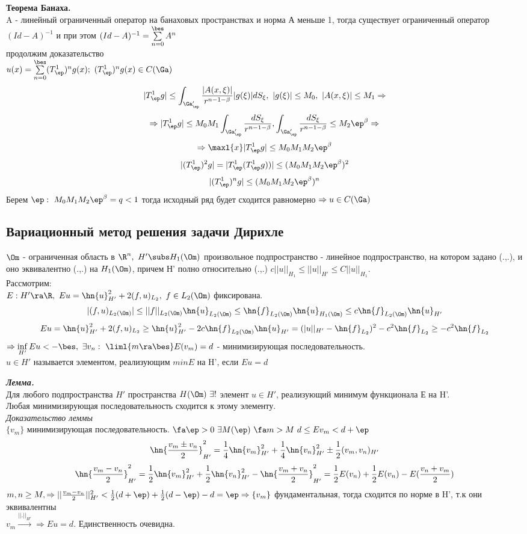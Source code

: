 \documentclass[a4paper,draft]{article}
\begin{document}
\textbf{Теорема Банаха.}\\
A - линейный ограниченный оператор на банаховых пространствах
и норма А меньше 1, тогда существует ограниченный оператор
$(Id-A)^{-1}$  и при этом $(Id-A)^{-1}=\sum\limits_{n=0}^\bes A^n$\\
продолжим доказательство\\
$u(x)=\sum\limits_{n=0}^\bes (T_\ep^1)^n g(x);\ (T_\ep^1)^n g(x)\in C(\Ga)$
$$
|T_\ep^1 g|\le
\int_{\Ga'_\ep}\frac{|A(x,\xi)|}{r^{n-1-\beta}}|g(\xi)|dS_\xi,\
|g(\xi)|\le M_0,\ |A(x,\xi)|\le M_1\Rightarrow
$$
$$
\Rightarrow
|T_\ep^1 g|\le
M_0M_1\int_{\Ga'_\ep}\frac{dS_\xi}{r^{n-1-\beta}},
\int_{\Ga'_\ep}\frac{dS_\xi}{r^{n-1-\beta}}\le M_2\ep^\beta
\Rightarrow
$$
$$
\Rightarrow
\maxl{x}|T_\ep^1 g|\le
M_0 M_1 M_2 \ep^\beta
$$
$$
|(T_\ep^1)^2 g|=|T_\ep^1(T_\ep^1 g))|\le (M_0M_1M_2\ep^\beta)^2
$$
$$
|(T_\ep^1)^n g|\le (M_0M_1M_2\ep^\beta)^n
$$
Берем $\ep:\ M_0M_1M_2\ep^\beta=q<1$ тогда исходный ряд будет сходится равномерно
$\Rightarrow u\in C(\Ga)$

\subsection{Вариационный метод решения задачи Дирихле}
$\Om$ - ограниченная область в $\R^n,\ H'\subs H_1(\Om)$
произвольное подпространство - линейное подпространство,
на котором задано (.,.), и оно эквивалентно (.,.) на $H_1(\Om)$,
причем Н' полно относительно (.,.) $c||u||_{H_1}\le||u||_{H'}\le C||u||_{H_1}$.\\
Рассмотрим:\\
$E:H'\ra\R,\ Eu=\hn{u}_{H'}^2+2(f,u)_{L_2},\ f\in L_2(\Om)$ фиксирована.
$$
|(f,u)_{L_2(\Om)}|\le||f||_{L_2(\Om)} \hn{u}_{L_2(\Om)}\le \hn{f}_{L_2(\Om)} \hn{u}_{H_1(\Om)}\le
c \hn{f}_{L_2(\Om)} \hn{u}_{H'}
$$
$$
Eu=\hn{u}_{H'}^2+2(f,u)_{L_2}\ge \hn{u}_{H'}^2-2c \hn{f}_{L_2(\Om)}\hn{u}_{H'}
=(|u||_{H'}-\hn{f}_{L_2})^2-c^2\hn{f}_{L_2}\ge -c^2\hn{f}_{L_2}
$$
$\Rightarrow \inf\limits_{H'}Eu<-\bes,\ \exists v_n:\ \liml{m\ra\bes}E(v_m)=d$
- минимизирующая последовательность.\\
$u\in H'$ называется элементом, реализующим $min E$ на H', если $Eu=d$

\textbf{\textit{Лемма.}}\\
Для любого подпространства $H'$ пространства $H(\Om)\ \exists !$
элемент $u\in H'$, реализующий минимум функционала Е на H'.\\
Любая минимизирующая последовательность сходится к этому элементу.\\
\textit{Доказательство леммы}\\
$\{v_m\}$ минимизирующая последовательность. $\fa\ep>0\
\exists M(\ep)\ \fa m>M\ d\le Ev_m<d+\ep$
$$
\hn{\frac{v_m\pm v_n}{2}}_{H'}^2= \frac14 \hn{v_m}_{H'}^2+\frac14 \hn{v_n}_{H'}^2 \pm\frac12(v_m,v_n)_{H'}
$$
$$\hn{\frac{v_m- v_n}{2}}_{H'}^2= \frac12 \hn{v_m}_{H'}^2+\frac12 \hn{v_n}_{H'}^2- \hn{\frac{v_m+ v_n}{2}}_{H'}^2
=\frac12E(v_n)+\frac12E(v_n)-E(\frac{v_n+v_m}{2})
$$
$
m,n\ge M,\Rightarrow
||\frac{v_m- v_n}{2}||_{H'}^2<\frac12(d+\ep)+\frac12(d-\ep)
-d=\ep\Rightarrow\{v_m\}
$
фундаментальная, тогда сходится по норме в H', т.к они эквивалентны\\
$v_m\xrightarrow{||.||_{H'}}\Rightarrow Eu=d$. Единственность очевидна.
\end{document}
